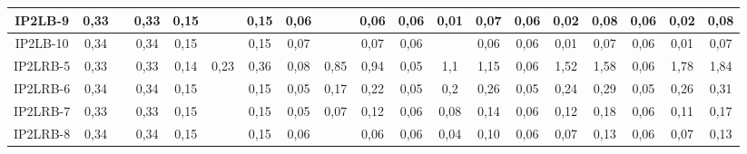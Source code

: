 \begin{table}[h]
{\begin{tabular}{c|c|c|c|c|c|c|c|c|c|c|c|c|c|c|c|c|c|c|}
\multicolumn{1}{|c|}{IP2LB-9} & {\color[HTML]{656565} 0,33} & {\color[HTML]{656565} } & 0,33 & {\color[HTML]{656565} 0,15} & {\color[HTML]{656565} } & 0,15 & {\color[HTML]{656565} 0,06} & {\color[HTML]{656565} } & 0,06 & {\color[HTML]{656565} 0,06} & {\color[HTML]{656565} 0,01} & 0,07 & {\color[HTML]{656565} 0,06} & {\color[HTML]{656565} 0,02} & 0,08 & {\color[HTML]{656565} 0,06} & {\color[HTML]{656565} 0,02} & 0,08 \\ \hline
\multicolumn{1}{|c|}{IP2LB-10} & {\color[HTML]{656565} 0,34} & {\color[HTML]{656565} } & 0,34 & {\color[HTML]{656565} 0,15} & {\color[HTML]{656565} } & 0,15 & {\color[HTML]{656565} 0,07} & {\color[HTML]{656565} } & 0,07 & {\color[HTML]{656565} 0,06} & {\color[HTML]{656565} } & 0,06 & {\color[HTML]{656565} 0,06} & {\color[HTML]{656565} 0,01} & 0,07 & {\color[HTML]{656565} 0,06} & {\color[HTML]{656565} 0,01} & 0,07 \\ \hline
\multicolumn{1}{|c|}{IP2LRB-5} & {\color[HTML]{656565} 0,33} & {\color[HTML]{656565} } & 0,33 & {\color[HTML]{656565} 0,14} & {\color[HTML]{656565} 0,23} & 0,36 & {\color[HTML]{656565} 0,08} & {\color[HTML]{656565} 0,85} & 0,94 & {\color[HTML]{656565} 0,05} & {\color[HTML]{656565} 1,1} & 1,15 & {\color[HTML]{656565} 0,06} & {\color[HTML]{656565} 1,52} & 1,58 & {\color[HTML]{656565} 0,06} & {\color[HTML]{656565} 1,78} & 1,84 \\ \hline
\multicolumn{1}{|c|}{IP2LRB-6} & {\color[HTML]{656565} 0,34} & {\color[HTML]{656565} } & 0,34 & {\color[HTML]{656565} 0,15} & {\color[HTML]{656565} } & 0,15 & {\color[HTML]{656565} 0,05} & {\color[HTML]{656565} 0,17} & 0,22 & {\color[HTML]{656565} 0,05} & {\color[HTML]{656565} 0,2} & 0,26 & {\color[HTML]{656565} 0,05} & {\color[HTML]{656565} 0,24} & 0,29 & {\color[HTML]{656565} 0,05} & {\color[HTML]{656565} 0,26} & 0,31 \\ \hline
\multicolumn{1}{|c|}{IP2LRB-7} & {\color[HTML]{656565} 0,33} & {\color[HTML]{656565} } & 0,33 & {\color[HTML]{656565} 0,15} & {\color[HTML]{656565} } & 0,15 & {\color[HTML]{656565} 0,05} & {\color[HTML]{656565} 0,07} & 0,12 & {\color[HTML]{656565} 0,06} & {\color[HTML]{656565} 0,08} & 0,14 & {\color[HTML]{656565} 0,06} & {\color[HTML]{656565} 0,12} & 0,18 & {\color[HTML]{656565} 0,06} & {\color[HTML]{656565} 0,11} & 0,17 \\ \hline
\multicolumn{1}{|c|}{IP2LRB-8} & {\color[HTML]{656565} 0,34} & {\color[HTML]{656565} } & 0,34 & {\color[HTML]{656565} 0,15} & {\color[HTML]{656565} } & 0,15 & {\color[HTML]{656565} 0,06} & {\color[HTML]{656565} } & 0,06 & {\color[HTML]{656565} 0,06} & {\color[HTML]{656565} 0,04} & 0,10 & {\color[HTML]{656565} 0,06} & {\color[HTML]{656565} 0,07} & 0,13 & {\color[HTML]{656565} 0,06} & {\color[HTML]{656565} 0,07} & 0,13 \\ \hline

\end{tabular}}
\end{table}
